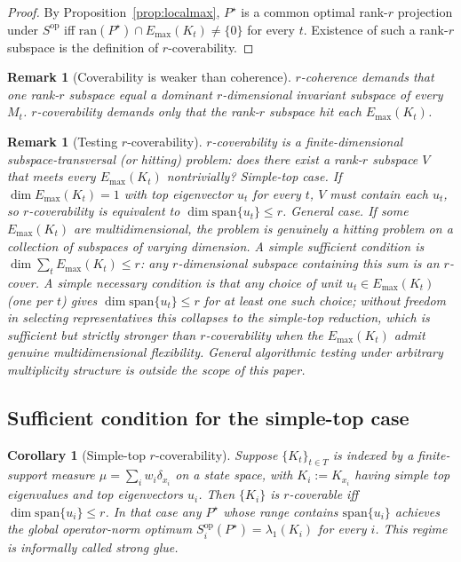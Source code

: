 \documentclass[final,3p,times]{elsarticle}
\newtheorem{corollary}[theorem]{Corollary}
\newtheorem{remark}[theorem]{Remark}
\newcommand{\ran}{\mathrm{ran}}
\newcommand{\Emax}{E_{\max}}
\begin{document}
\begin{proof}
By Proposition~\ref{prop:localmax}, $P^\star$ is a common optimal rank-$r$
projection under $S^{\mathrm{op}}$ iff $\ran(P^\star)\cap\Emax(K_t)\ne\{0\}$
for every $t$.
Existence of such a rank-$r$ subspace is the definition of
$r$-coverability.
\end{proof}

\begin{remark}[Coverability is weaker than coherence]
$r$-coherence demands that one rank-$r$ subspace \emph{equal} a dominant
$r$-dimensional invariant subspace of every $M_t$.
$r$-coverability demands only that the rank-$r$ subspace \emph{hit}
each $\Emax(K_t)$.
\end{remark}

\begin{remark}[Testing $r$-coverability]
\label{rem:covtest}
$r$-coverability is a finite-dimensional subspace-transversal (or
\emph{hitting}) problem: does there exist a rank-$r$ subspace $V$ that
meets every $\Emax(K_t)$ nontrivially?
\emph{Simple-top case.}
If $\dim\Emax(K_t)=1$ with top eigenvector $u_t$ for every $t$, $V$
must contain each $u_t$, so $r$-coverability is equivalent to
$\dim\mathrm{span}\{u_t\}\le r$.
\emph{General case.}
If some $\Emax(K_t)$ are multidimensional, the problem is genuinely a
hitting problem on a collection of subspaces of varying dimension.
A simple sufficient condition is $\dim\sum_t\Emax(K_t)\le r$: any
$r$-dimensional subspace containing this sum is an $r$-cover.
A simple necessary condition is that any choice of unit
$u_t\in\Emax(K_t)$ (one per $t$) gives $\dim\mathrm{span}\{u_t\}\le r$
for at least one such choice; without freedom in selecting representatives
this collapses to the simple-top reduction, which is sufficient but
strictly stronger than $r$-coverability when the $\Emax(K_t)$ admit
genuine multidimensional flexibility.
General algorithmic testing under arbitrary multiplicity structure is
outside the scope of this paper.
\end{remark}

\subsection{Sufficient condition for the simple-top case}

\begin{corollary}[Simple-top $r$-coverability]\label{cor:strongglue}
Suppose $\{K_t\}_{t\in T}$ is indexed by a finite-support measure
$\mu=\sum_i w_i\delta_{x_i}$ on a state space, with $K_i:=K_{x_i}$ having
simple top eigenvalues and top eigenvectors $u_i$.
Then $\{K_i\}$ is $r$-coverable iff $\dim\mathrm{span}\{u_i\}\le r$.
In that case any $P^\star$ whose range contains $\mathrm{span}\{u_i\}$
achieves the global operator-norm optimum
$S^{\mathrm{op}}_i(P^\star)=\lambda_1(K_i)$ for every $i$.
This regime is informally called \emph{strong glue}.
\end{corollary}
\end{document}
